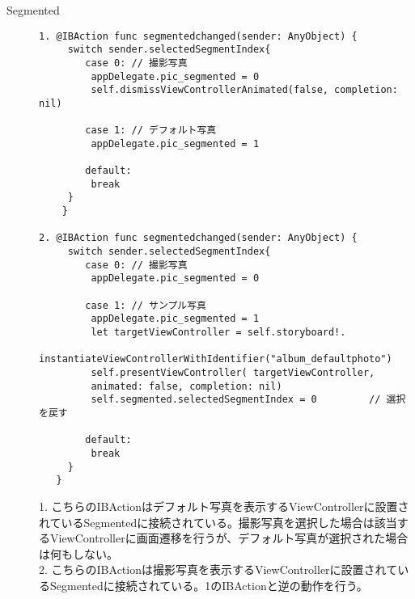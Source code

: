 \begin{description}
\item[Segmented]\mbox{} 
\begin{lstlisting}[basicstyle=\ttfamily\footnotesize, frame=single]
1. @IBAction func segmentedchanged(sender: AnyObject) {
     switch sender.selectedSegmentIndex{
        case 0: // 撮影写真
         appDelegate.pic_segmented = 0
         self.dismissViewControllerAnimated(false, completion: nil)
         
        case 1: // デフォルト写真
         appDelegate.pic_segmented = 1
         
        default:
         break
     }
    }

2. @IBAction func segmentedchanged(sender: AnyObject) {
     switch sender.selectedSegmentIndex{
        case 0: // 撮影写真
         appDelegate.pic_segmented = 0
            
        case 1: // サンプル写真
         appDelegate.pic_segmented = 1
         let targetViewController = self.storyboard!.
         instantiateViewControllerWithIdentifier("album_defaultphoto")
         self.presentViewController( targetViewController, 
         animated: false, completion: nil)
         self.segmented.selectedSegmentIndex = 0         // 選択を戻す
         
        default:
         break
     }
   }
\end{lstlisting}

1. こちらのIBActionはデフォルト写真を表示するViewControllerに設置されているSegmentedに接続されている。撮影写真を選択した場合は該当するViewControllerに画面遷移を行うが、デフォルト写真が選択された場合は何もしない。 \\
2. こちらのIBActionは撮影写真を表示するViewControllerに設置されているSegmentedに接続されている。1のIBActionと逆の動作を行う。 \\

\end{description}

\newpage

